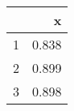 \begin{table}[ht]
\centering
\begin{tabular}{rr}
  \hline
 & x \\ 
  \hline
1 & 0.838 \\ 
  2 & 0.899 \\ 
  3 & 0.898 \\ 
   \hline
\end{tabular}
\end{table}
